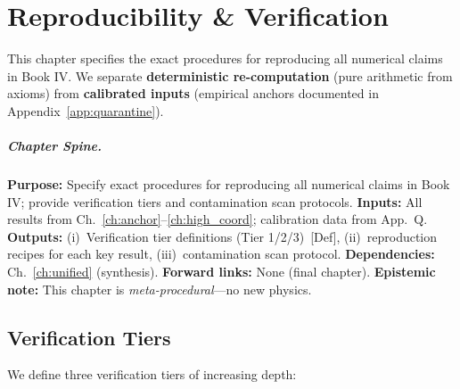 
\chapter{Reproducibility \& Verification}
\label{ch:repro}

\begin{chapterbox}
This chapter specifies the exact procedures for reproducing all numerical
claims in Book IV. We separate \textbf{deterministic re-computation} (pure
arithmetic from axioms) from \textbf{calibrated inputs} (empirical anchors
documented in Appendix~\ref{app:quarantine}).
\end{chapterbox}

\paragraph{Chapter Spine.}
\textbf{Purpose:} Specify exact procedures for reproducing all numerical claims
in Book IV; provide verification tiers and contamination scan protocols.
\textbf{Inputs:} All results from Ch.~\ref{ch:anchor}--\ref{ch:high_coord};
calibration data from App.~Q.
\textbf{Outputs:} (i)~Verification tier definitions (Tier 1/2/3)~[Def],
(ii)~reproduction recipes for each key result, (iii)~contamination scan protocol.
\textbf{Dependencies:} Ch.~\ref{ch:unified} (synthesis).
\textbf{Forward links:} None (final chapter).
\textbf{Epistemic note:} This chapter is \emph{meta-procedural}---no new physics.

\section{Verification Tiers}
\label{sec:repro:tiers}

We define three verification tiers of increasing depth:

